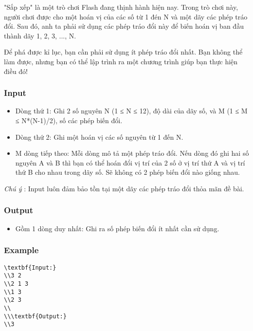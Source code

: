 



   "Sắp xếp" là một trò chơi Flash đang thịnh hành hiện nay. Trong trò chơi này, người chơi được cho một hoán vị của các số từ 1 đén N và một dãy các phép tráo đổi. Sau đó, anh ta phải sử dụng các phép tráo đổi này để biến hoán vị ban đầu thành dãy 1, 2, 3, ..., N.  

   Để phá được kỉ lục, bạn cần phải sử dụng ít phép tráo đổi nhất. Bạn không thể làm được, nhưng bạn có thể lập trình ra một chương trình giúp bạn thực hiện điều đó!  

\subsubsection{   Input  }
\begin{itemize}
	\item     Dòng thứ 1: Ghi 2 số nguyên N (1 ≤ N ≤ 12), độ dài của dãy số, và M (1 ≤ M ≤ N*(N-1)/2), số các phép biến đổi.   
\end{itemize}
\begin{itemize}
	\item     Dòng thứ 2: Ghi một hoán vị các số nguyên từ 1 đến N.   
	\item     M dòng tiếp theo: Mỗi dòng mô tả một phép tráo đổi. Nếu dòng đó ghi hai số nguyên A và B thì bạn có thể hoán đổi vị trí của 2 số ở vị trí thứ A và vị trí thứ B cho nhau trong dãy số. Sẽ không có 2 phép biến đổi nào giống nhau.   
\end{itemize}

\emph{    Chú ý   }   : Input luôn đảm bảo tồn tại một dãy các phép tráo đổi thỏa mãn đề bài.  

\subsubsection{   Output  }
\begin{itemize}
	\item     Gồm 1 dòng duy nhất: Ghi ra số phép biến đổi ít nhất cần sử dụng.   
\end{itemize}

\subsubsection{   Example  }
\begin{verbatim}
\textbf{Input:}
\\3 2
\\2 1 3
\\1 3
\\2 3
\\
\\\textbf{Output:}
\\3\end{verbatim}